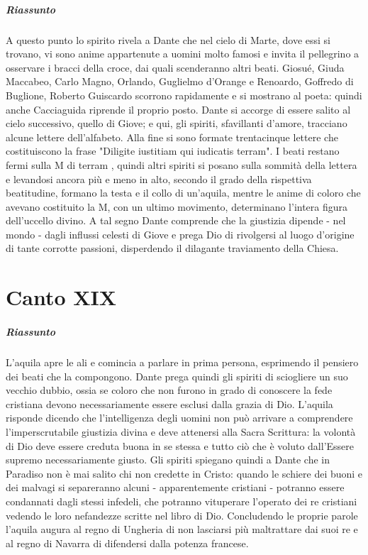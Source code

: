 \documentclass[a4paper, twoside, titlepage]{book}
\begin{document}
\paragraph{Riassunto} A questo punto lo spirito rivela a Dante che nel cielo di Marte, dove essi si trovano, vi sono anime appartenute a uomini molto famosi e invita il pellegrino a osservare i bracci della croce, dai quali scenderanno altri beati. Giosué, Giuda Maccabeo, Carlo Magno, Orlando, Guglielmo d’Orange e Renoardo, Goffredo di Buglione, Roberto Guiscardo scorrono rapidamente e si mostrano al poeta: quindi anche Cacciaguida riprende il proprio posto. Dante si accorge di essere salito al cielo successivo, quello di Giove; e qui, gli spiriti, sfavillanti d’amore, tracciano alcune lettere dell’alfabeto. Alla fine si sono formate trentacinque lettere che costituiscono la frase "Diligite iustitiam qui iudicatis terram". I beati restano fermi sulla M di terram , quindi altri spiriti si posano sulla sommità della lettera e levandosi ancora più e meno in alto, secondo il grado della rispettiva beatitudine, formano la testa e il collo di un’aquila, mentre le anime di coloro che avevano costituito la M, con un ultimo movimento, determinano l’intera figura dell’uccello divino. A tal segno Dante comprende che la giustizia dipende - nel mondo - dagli influssi celesti di Giove e prega Dio di rivolgersi al luogo d’origine di tante corrotte passioni, disperdendo il dilagante traviamento della Chiesa.

\chapter{Canto XIX}

\paragraph{Riassunto} L’aquila apre le ali e comincia a parlare in prima persona, esprimendo il pensiero dei beati che la compongono. Dante prega quindi gli spiriti di sciogliere un suo vecchio dubbio, ossia se coloro che non furono in grado di conoscere la fede cristiana devono necessariamente essere esclusi dalla grazia di Dio. L’aquila risponde dicendo che l’intelligenza degli uomini non può arrivare a comprendere l’imperscrutabile giustizia divina e deve attenersi alla Sacra Scrittura: la volontà di Dio deve essere creduta buona in se stessa e tutto ciò che è voluto dall’Essere supremo necessariamente giusto. Gli spiriti spiegano quindi a Dante che in Paradiso non è mai salito chi non credette in Cristo: quando le schiere dei buoni e dei malvagi si separeranno alcuni - apparentemente cristiani - potranno essere condannati dagli stessi infedeli, che potranno vituperare l’operato dei re cristiani vedendo le loro nefandezze scritte nel libro di Dio. Concludendo le proprie parole l’aquila augura al regno di Ungheria di non lasciarsi più maltrattare dai suoi re e al regno di Navarra di difendersi dalla potenza francese.
\end{document}
